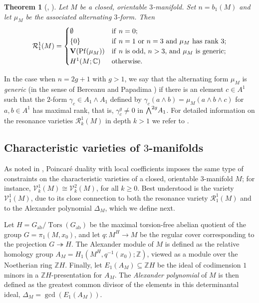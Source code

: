 \documentclass{article}
\numberwithin{equation}{section}
\newtheorem{theorem}{Theorem}[section]
\theoremstyle{definition}
\newcommand{\Z}{\mathbb{Z}}
\renewcommand{\C}{\mathbb{C}}
\newcommand{\VV}{\mathcal{V}}
\newcommand{\RR}{\mathcal{R}}
\DeclareMathOperator{\ab}{{ab}}
\DeclareMathOperator{\Tors}{Tors}
\DeclareMathOperator{\Pf}{Pf}
\newcommand{\surj}{\twoheadrightarrow}
\newcommand{\bwedge}{\mbox{\normalsize $\bigwedge$}}
\begin{document}
\begin{theorem}[\cite{Su-edinb}, \cite{Su-mm}]
\label{thm:res closed3m}
Let $M$ be a closed, orientable $3$-manifold.  Set $n=b_1(M)$ 
and let $\mu_M$ be the associated alternating $3$-form.  Then 
\begin{equation}
\label{eq:r1 3m}
\RR^1_1(M)= 
\begin{cases}
\emptyset & \text{if\/ $n=0$};\\
\{0\} & \text{if\/ $n=1$ or $n=3$ and $\mu_M$ has rank $3$};\\
\mathbf{V}(\Pf(\mu_M))  & \text{if\/  $n$ is odd, $n>3$, 
and $\mu_M$ is generic};\\
H^1(M;\C) & \text{otherwise}.
\end{cases}
\end{equation}
\end{theorem}

In the case when $n=2g+1$ with $g>1$, we say that the alternating form 
$\mu_M$ is {\em generic} (in the sense of Berceanu and Papadima 
\cite{BP}) if there is an element $c\in A^1$ such that the $2$-form 
$\gamma_c\in A_1\wedge A_1$ defined by 
$\gamma_c(a \wedge b)=\mu_M(a\wedge b\wedge c)$ for $a,b\in A^1$ 
has maximal rank, that is, $\gamma^{g}_c\ne 0$ in $\bwedge^{2g} A_1$.  
For detailed information on the resonance varieties 
$\RR^1_k(M)$ in depth $k>1$ we refer to \cite{Su-edinb}. 

\subsection{Characteristic varieties of $3$-manifolds}
\label{subsec:cvs 3-mfd} 
As noted in \cite{Su-mm}, Poincar\'e duality with local coefficients imposes 
the same type of constraints on the characteristic varieties of a closed, orientable 
$3$-manifold $M$; for instance, $\VV^{1}_k(M)\cong \VV^{2}_k(M)$, 
for all $k\ge 0$. Best understood is the variety $\VV^{1}_1(M)$, due
to its close connection to both the resonance variety $\RR^{1}_1(M)$ 
and to the Alexander polynomial $\Delta_M$, which we define next. 

Let $H=G_{\ab}/\Tors(G_{\ab})$ be the maximal 
torsion-free abelian quotient of the group $G=\pi_1(M, x_0)$, and 
let $q\colon M^{H}\to M$ be the regular cover corresponding to the 
projection $G\surj H$.  The Alexander module of $M$ is 
defined as the relative homology group 
$A_M= H_1(M^H,q^{-1}(x_0); \Z)$, viewed as a module 
over the Noetherian ring $\Z{H}$. 
Finally, let $E_1(A_M)\subseteq \Z{H}$ be the 
ideal of codimension $1$ minors in a $\Z{H}$-presentation for $A_M$.  
The {\em Alexander polynomial}\/ of $M$ is then defined as the greatest 
common divisor of the elements in this determinantal ideal,
$\Delta_M=\gcd ( E_1(A_M))$. 
\end{document}
